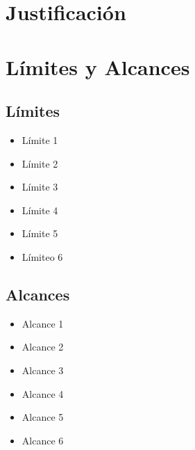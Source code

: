\section{Justificaci\'on}
\section{L\'imites y Alcances}
\subsection{L\'imites}
\begin{itemize}
	
	\item L\'imite 1 
	\item L\'imite 2 
	\item L\'imite 3 
	\item L\'imite 4 
	\item L\'imite 5 
	\item L\'imiteo 6 
\end{itemize}
\subsection{Alcances}

\begin{itemize}
	
	\item Alcance 1 
	\item Alcance 2
	\item Alcance 3
	\item Alcance 4
	\item Alcance 5
	\item Alcance 6
\end{itemize}
